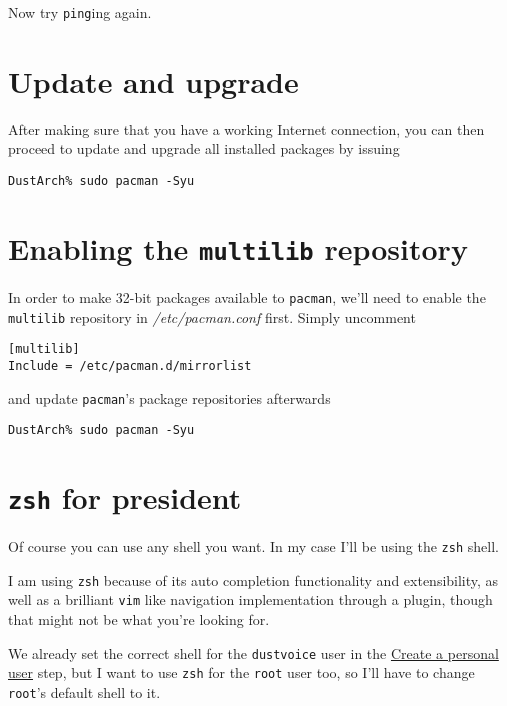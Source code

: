 \documentclass[9pt]{report}
\newenvironment{NOTE}
{\begin{tcolorbox}[colback=admonitionBG,coltitle=draculaFG,colframe=draculaBlue,colbacktitle=draculaBlue,title=NOTE]}
{\end{tcolorbox}}
\begin{document}
Now try \texttt{ping}ing again.



\newpage

\hypertarget{x-update-and-upgrade}{\section{Update and upgrade}}
After making sure that you have a working Internet connection, you can then proceed to update and upgrade all installed packages by issuing


\begin{verbatim}
DustArch% sudo pacman -Syu
\end{verbatim}


\newpage

\hypertarget{x-enabling-the-multilib-repository}{\section{Enabling the \texttt{multilib} repository}}
In order to make 32-bit packages available to \texttt{pacman}, we’ll need to enable the \texttt{multilib} repository in \textit{/etc/pacman.conf} first.
Simply uncomment


\begin{verbatim}
[multilib]
Include = /etc/pacman.d/mirrorlist
\end{verbatim}

and update \texttt{pacman}'s package repositories afterwards


\begin{verbatim}
DustArch% sudo pacman -Syu
\end{verbatim}


\newpage

\hypertarget{x-zsh-for-president}{\section{\texttt{zsh} for president}}
Of course you can use any shell you want.
In my case I’ll be using the \texttt{zsh} shell.


\begin{NOTE}
    I am using \texttt{zsh} because of its auto completion functionality and extensibility, as well as a brilliant \texttt{vim} like navigation implementation through a plugin, though that might not be what you’re looking for.

\end{NOTE}
We already set the correct shell for the \texttt{dustvoice} user in the \hyperlink{x-create-a-personal-user}{Create a personal user} step, but I want to use \texttt{zsh} for the \texttt{root} user too, so I’ll have to change \texttt{root}'s default shell to it.
\end{document}

